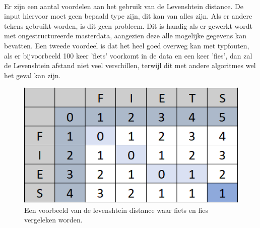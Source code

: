\\\indent
Er zijn een aantal voordelen aan het gebruik van de Levenshtein distance. De input hiervoor moet geen bepaald type zijn, dit kan van alles zijn. Als er andere tekens gebruikt worden, is dit geen probleem. Dit is handig als er gewerkt wordt met ongestructureerde masterdata, aangezien deze alle mogelijke gegevens kan bevatten. Een tweede voordeel is dat het heel goed overweg kan met typfouten, als er bijvoorbeeld 100 keer 'fiets' voorkomt in de data en een keer 'fies', dan zal de Levenshtein afstand niet veel verschillen, terwijl dit met andere algoritmes wel het geval kan zijn.
\\\indent
\begin{figure}[h]
    \centering
    \includegraphics[width=0.7\linewidth]{../foto's/levenshteinfiets}
    \caption{Een voorbeeld van de levenshtein distance waar fiets en fies vergeleken worden.}
    \label{fig:levenshtein_voorbeeld_fiets}
\end{figure}

